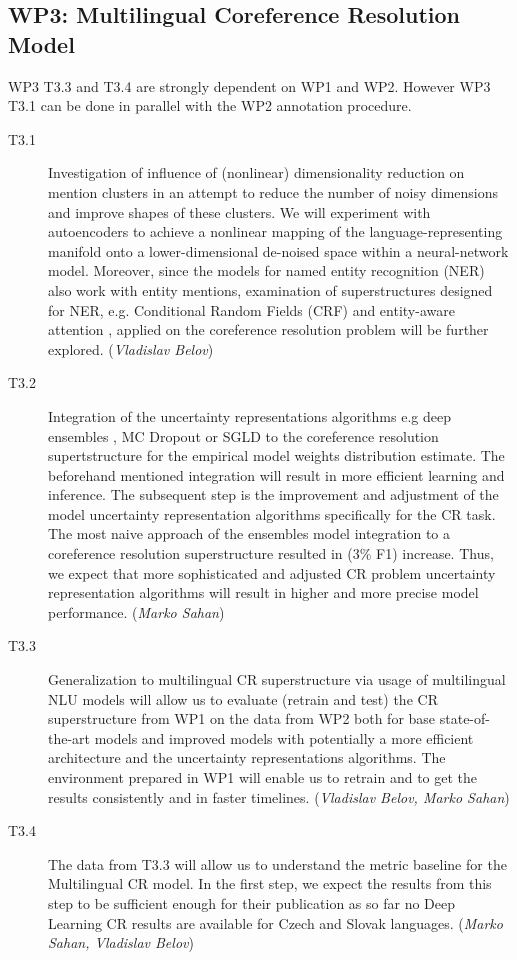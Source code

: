 \subsection*{WP3: Multilingual Coreference Resolution Model}

WP3 T3.3 and T3.4  are strongly dependent on WP1 and WP2. However WP3 T3.1 can be done in parallel with the WP2 annotation procedure.

\begin{description}
	\item [T3.1] Investigation of influence of (nonlinear) dimensionality reduction on mention clusters in an attempt to reduce the number of noisy dimensions and improve shapes of these clusters. We will experiment with autoencoders \cite{autoencoders-Zabalza2016,autoencoders-Sahay2019} to achieve a nonlinear mapping of the language-representing manifold onto a lower-dimensional de-noised space within a neural-network model. Moreover, since the models for named entity recognition (NER) also work with entity mentions, examination of superstructures designed for NER, e.g. Conditional Random Fields (CRF) \cite{ner-Strakova2019,ner-Zhanming2019} and entity-aware attention \cite{ner-Yamada2020}, applied on the coreference resolution problem will be further explored. (\textit{Vladislav Belov})
	\item [T3.2] Integration of the uncertainty representations algorithms e.g deep ensembles \cite{lakshminarayanan2016simple}, MC Dropout \cite{gal2017deep} or SGLD \cite{welling2011bayesian} to the coreference resolution supertstructure for the empirical model weights distribution estimate. The beforehand mentioned integration will result in more efficient learning and inference. The subsequent step is the improvement and adjustment of the model uncertainty representation algorithms specifically for the CR task. The most naive approach of the ensembles model integration to a coreference resolution superstructure \cite{cr-Lee17} resulted in (3\% F1) increase. Thus, we expect that more sophisticated and adjusted CR problem uncertainty representation algorithms will result in higher and more precise model performance. (\textit{Marko Sahan})
	\item [T3.3] Generalization to multilingual CR superstructure via usage of multilingual NLU models will allow us to evaluate (retrain and test) the CR superstructure from WP1 on the data from WP2 both for base state-of-the-art models and improved models with potentially a more efficient architecture and the uncertainty representations algorithms. The environment prepared in WP1 will enable us to retrain and to get the results consistently and in faster timelines. (\textit{Vladislav Belov, Marko Sahan})	
	\item  [T3.4] The data from T3.3 will allow us to understand the metric baseline for the Multilingual CR model. In the first step, we expect the results from this step to be sufficient enough for their publication as so far no Deep Learning CR results are available for Czech and Slovak languages. (\textit{Marko Sahan, Vladislav Belov})

\end{description}


